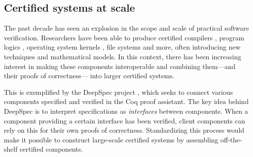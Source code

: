 \documentclass[sigplan,screen]{acmart}
\begin{document}


\subsection{Certified systems at scale} %
\label{ssec:certsys}

The past decade has seen an explosion
in the scope and scale of practical software verification.
Researchers have been able to produce certified
compilers \cite{compcert},
program logics \cite{vst},
operating system kernels \cite{sel4,popl15},
file systems \cite{fscq} and more,
often introducing new techniques
and mathematical models.
In this context,
there has been increasing interest in
making these components
interoperable and
combining them---and their proofs of correctness---%
into larger certified systems.

This is exemplified by the DeepSpec project \cite{deepspec},
which seeks to connect various components
specified and verified in the Coq proof assistant.
The key idea behind DeepSpec
is to interpret specifications as \emph{interfaces}
between components.
When a component providing a certain interface
has been verified,
client components can rely on this
for their own proofs of correctness.
Standardizing this process would make it possible
to construct large-scale certified systems
by assembling off-the-shelf certified components.

\end{document}
